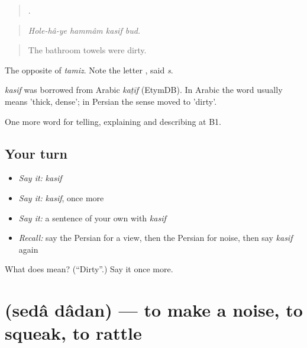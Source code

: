 \begin{quote}
    .
\end{quote}

\begin{quote}
\emph{Hole-hâ-ye hammâm kasif bud.}
\end{quote}

\begin{quote}
The bathroom towels were dirty.
\end{quote}

The opposite of \emph{tamiz}. Note the letter , said \emph{s}.

\begin{cousinweb}
\emph{kasif} was borrowed from Arabic \emph{kaṯīf} (EtymDB). In Arabic the word usually means 'thick, dense'; in Persian the sense moved to 'dirty'.
\end{cousinweb}

\begin{grammarlens}[title={What you've built}]
One more word for telling, explaining and describing at B1.
\end{grammarlens}

\subsection*{Your turn}
\begin{itemize}
\raggedright
  \item \emph{Say it:} \emph{kasif}
  \item \emph{Say it:} \emph{kasif}, once more
  \item \emph{Say it:} a sentence of your own with \emph{kasif}
  \item \emph{Recall:} say the Persian for a view, then the Persian for noise, then say \emph{kasif} again
\end{itemize}

\begin{tcolorbox}[breakable,colback=teal!4,colframe=teal!35!black,title={Before you move on}]
What does  mean? (\textquotedblleft{}Dirty\textquotedblright{}.) Say it once more.
\end{tcolorbox}
\section[\texorpdfstring{\fa{صدا} \fa{دادن} (sedâ dâdan)}{صدا دادن (sedâ dâdan)}]{  (sedâ dâdan) — to make a noise, to squeak, to rattle}

